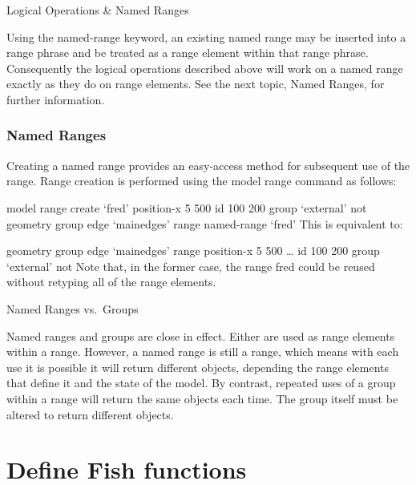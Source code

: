 \documentclass[a4paper, nobind]{templates/ociamthesis}
\begin{document}
Logical Operations \& Named Ranges

Using the named-range keyword, an existing named range may be inserted
into a range phrase and be treated as a range element within that range
phrase. Consequently the logical operations described above will work on
a named range exactly as they do on range elements. See the next topic,
Named Ranges, for further information.

\hypertarget{named-ranges}{%
\subsubsection{Named Ranges}\label{named-ranges}}

Creating a named range provides an easy-access method for subsequent use
of the range. Range creation is performed using the model range command
as follows:

model range create `fred' position-x 5 500 id 100 200 group `external'
not geometry group edge `mainedges' range named-range `fred' This is
equivalent to:

geometry group edge `mainedges' range position-x 5 500 \ldots{} id 100 200
group `external' not Note that, in the former case, the range fred could
be reused without retyping all of the range elements.

Named Ranges vs.~Groups

Named ranges and groups are close in effect. Either are used as range
elements within a range. However, a named range is still a range, which
means with each use it is possible it will return different objects,
depending the range elements that define it and the state of the model.
By contrast, repeated uses of a group within a range will return the
same objects each time. The group itself must be altered to return
different objects.

\hypertarget{define-fish-functions}{%
\section{Define Fish functions}\label{define-fish-functions}}
\end{document}
